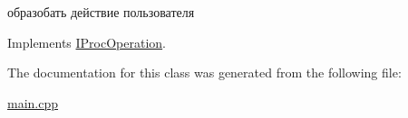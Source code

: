 образобать действие пользователя 



Implements \hyperlink{struct_i_proc_operation_a21afac17b66ccd9a1bf4c20ac71f3292}{I\+Proc\+Operation}.



The documentation for this class was generated from the following file\+:\begin{DoxyCompactItemize}
\item 
\hyperlink{main_8cpp}{main.\+cpp}\end{DoxyCompactItemize}
